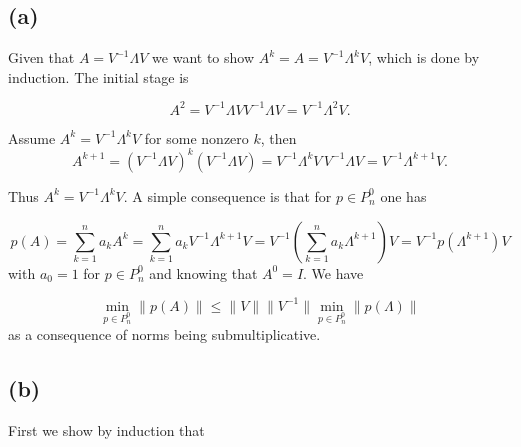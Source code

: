
\subsection*{(a)}


Given that $A = V^{-1}\Lambda V$ we want to show $A^{k} = A = V^{-1}\Lambda^{k} V$, which is done by induction. The initial stage is

\begin{equation}
  A^{2} = V^{-1}\Lambda V V^{-1}\Lambda V =V^{-1}\Lambda^{2} V.
\end{equation}

Assume $A^{k} = V^{-1}\Lambda^{k} V$ for some nonzero $k$, then
\begin{equation}
  A^{k+1} = (V^{-1}\Lambda V)^{k}(V^{-1}\Lambda V) = V^{-1}\Lambda^{k} V\,V^{-1}\Lambda V=V^{-1}\Lambda^{k+1} V.
\end{equation}

Thus $A^{k} = V^{-1}\Lambda^{k} V$. A simple consequence is that for $p\in P^{0}_{n}$ one has

\begin{equation}
  p(A) = \sum\limits_{k = 1}^{n} a_{k}A^{k} = \sum\limits_{k = 1}^{n} a_{k}V^{-1}\Lambda^{k+1} V= V^{-1}\left(\sum\limits_{k = 1}^{n} a_{k}\Lambda^{k+1}\right) V = V^{-1}p\left(\Lambda^{k+1}\right) V
\end{equation}
with $a_{0} = 1$ for $p\in P_{n}^{0}$ and knowing that $A^{0} = I$. We have

\begin{equation}
  \min\limits_{p\in P_{n}^{0}}\|p(A)\|\leq\|V\|\|V^{-1}\| \min\limits_{p\in P_{n}^{0}}\|p(\Lambda)\|
\end{equation}
as a consequence of norms being submultiplicative.
\subsection*{(b)}
First we show by induction that

